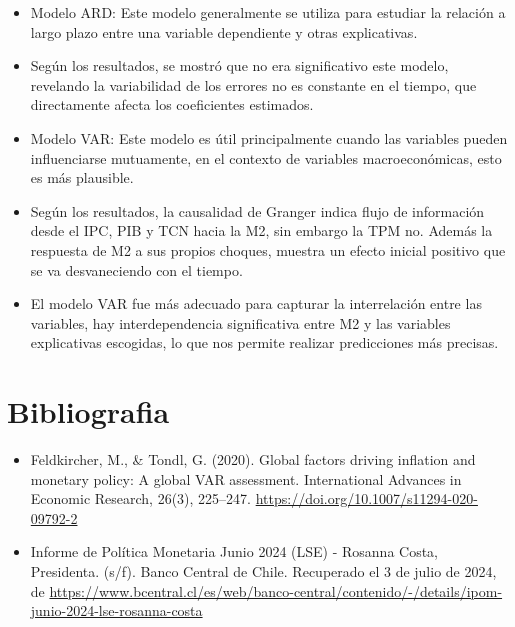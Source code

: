 \documentclass[
  12pt,
]{article}
\begin{document}
\begin{itemize}
\item
  Modelo ARD: Este modelo generalmente se utiliza para estudiar la
  relación a largo plazo entre una variable dependiente y otras
  explicativas.
\item
  Según los resultados, se mostró que no era significativo este modelo,
  revelando la variabilidad de los errores no es constante en el tiempo,
  que directamente afecta los coeficientes estimados.
\item
  Modelo VAR: Este modelo es útil principalmente cuando las variables
  pueden influenciarse mutuamente, en el contexto de variables
  macroeconómicas, esto es más plausible.
\item
  Según los resultados, la causalidad de Granger indica flujo de
  información desde el IPC, PIB y TCN hacia la M2, sin embargo la TPM
  no. Además la respuesta de M2 a sus propios choques, muestra un efecto
  inicial positivo que se va desvaneciendo con el tiempo.
\item
  El modelo VAR fue más adecuado para capturar la interrelación entre
  las variables, hay interdependencia significativa entre M2 y las
  variables explicativas escogidas, lo que nos permite realizar
  predicciones más precisas.
\end{itemize}

\section{Bibliografia}\label{bibliografia}

\begin{itemize}
\item
  Feldkircher, M., \& Tondl, G. (2020). Global factors driving inflation
  and monetary policy: A global VAR assessment. International Advances
  in Economic Research, 26(3), 225--247.
  \url{https://doi.org/10.1007/s11294-020-09792-2}
\item
  Informe de Política Monetaria Junio 2024 (LSE) - Rosanna Costa,
  Presidenta. (s/f). Banco Central de Chile. Recuperado el 3 de julio de
  2024, de
  \url{https://www.bcentral.cl/es/web/banco-central/contenido/-/details/ipom-junio-2024-lse-rosanna-costa}
\end{itemize}
\end{document}
